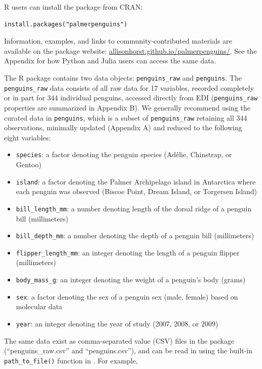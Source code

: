 R users can install the  package from CRAN:

\begin{verbatim}
install.packages("palmerpenguins")
\end{verbatim}

Information, examples, and links to community-contributed materials are
available on the  package website:
\href{https://allisonhorst.github.io/palmerpenguins/}{allisonhorst.github.io/palmerpenguins/}.
See the Appendix for how Python and Julia users can access the same
data.

The  R package contains two data objects:
\texttt{penguins\_raw} and \texttt{penguins}. The \texttt{penguins\_raw}
data consists of all raw data for 17 variables, recorded completely or
in part for 344 individual penguins, accessed directly from EDI
(\texttt{penguins\_raw} properties are summarized in Appendix B). We
generally recommend using the curated data in \texttt{penguins}, which
is a subset of \texttt{penguins\_raw} retaining all 344 observations,
minimally updated (Appendix A) and reduced to the following eight
variables:

\begin{itemize}
\tightlist
\item
  \texttt{species}: a factor denoting the penguin species (Adélie,
  Chinstrap, or Gentoo)
\item
  \texttt{island}: a factor denoting the Palmer Archipelago island in
  Antarctica where each penguin was observed (Biscoe Point, Dream
  Island, or Torgersen Island)
\item
  \texttt{bill\_length\_mm}: a number denoting length of the dorsal
  ridge of a penguin bill (millimeters)
\item
  \texttt{bill\_depth\_mm}: a number denoting the depth of a penguin
  bill (millimeters)
\item
  \texttt{flipper\_length\_mm}: an integer denoting the length of a
  penguin flipper (millimeters)
\item
  \texttt{body\_mass\_g}: an integer denoting the weight of a penguin's
  body (grams)
\item
  \texttt{sex}: a factor denoting the sex of a penguin sex (male,
  female) based on molecular data
\item
  \texttt{year}: an integer denoting the year of study (2007, 2008, or
  2009)
\end{itemize}

The same data exist as comma-separated value (CSV) files in the package
(``penguins\_raw.csv'' and ``penguins.csv''), and can be read in using
the built-in \texttt{path\_to\_file()} function in
. For example,

